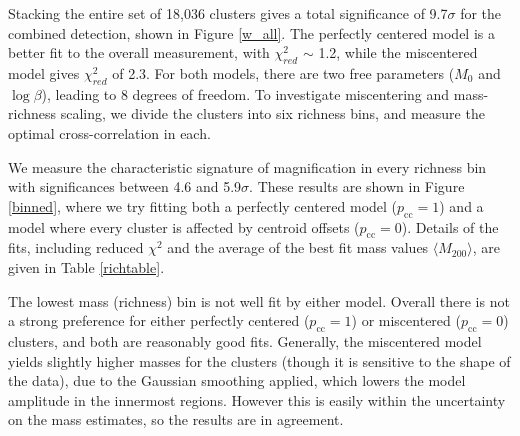 Stacking the entire set of 18,036 clusters gives a total significance of 9.7$\sigma$ for the combined detection, shown in Figure \ref{w_all}. The perfectly centered model is a better fit to the overall measurement, with $\chi^2_{red}$ $\sim$ 1.2, while the miscentered model gives $\chi^2_{red}$ of 2.3. For both models, there are two free parameters ($M_0$ and $\log\beta$), leading to 8 degrees of freedom. To investigate miscentering and mass-richness scaling, we divide the clusters into six richness bins, and measure the optimal cross-correlation in each. 

We measure the characteristic signature of magnification in every richness bin with significances between 4.6 and 5.9$\sigma$. These results are shown in Figure \ref{binned}, where we try fitting both a perfectly centered model ($p_{\mathrm{cc}}=1$) and a model where every cluster is affected by centroid offsets ($p_{\mathrm{cc}}=0$). Details of the fits, including reduced $\chi^2$ and the average of the best fit mass values $\langle M_{200} \rangle$, are given in Table \ref{richtable}.

The lowest mass (richness) bin is not well fit by either model. Overall there is not a strong preference for either perfectly centered ($p_{\mathrm{cc}}=1$) or miscentered ($p_{\mathrm{cc}}=0$) clusters, and both are reasonably good fits. Generally, the miscentered model yields slightly higher masses for the clusters (though it is sensitive to the shape of the data), due to the Gaussian smoothing applied, which lowers the model amplitude in the innermost regions. However this is easily within the uncertainty on the mass estimates, so the results are in agreement.


